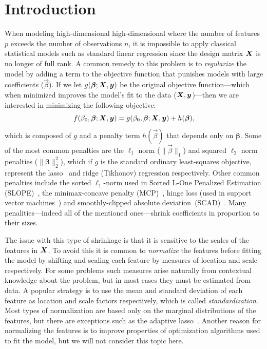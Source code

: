 \section{Introduction}

When modeling high-dimensional high-dimensional where the number of features \(p\) exceeds
the number of observations \(n\), it is impossible to apply classical statistical models
such as standard linear regression since the design matrix \(\boldsymbol X\) is no longer of full
rank. A common remedy to this problem is to \emph{regularize} the model by adding a term to
the objective function that punishes models with large coefficients (\(\vec\beta\)). If we
let \(g(\boldsymbol\beta; \boldsymbol X, \boldsymbol y)\) be the original objective function---which when
minimized improves the model's fit to the data (\(\boldsymbol X, \boldsymbol y\))---then we are
interested in minimizing the following objective:
\begin{equation}
  \label{eq:general-objective}
  f(\beta_0, \boldsymbol\beta; \boldsymbol X, \boldsymbol y) = g(\beta_0, \boldsymbol\beta; \boldsymbol X, \boldsymbol y) + h(\boldsymbol\beta),
\end{equation}
which is composed of \(g\) and a penalty term \(h(\vec\beta)\) that depends only on \(\bm{\beta}\).
Some of the most common penalties are the \(\ell_1\) norm (\(\lVert \vec\beta \rVert_1\)) and squared \(\ell_2\) norm
penalties (\(\lVert \bm{\beta} \rVert_2^2\)), which if \(g\) is the standard ordinary least-squares objective, represent
the lasso~\citep{tibshirani1996,santosa1986,donoho1994} and ridge (Tikhonov) regression
respectively. Other common penalties include the sorted \(\ell_1\)-norm used in Sorted
L-One Penalized Estimation (SLOPE)~\citep{bogdan2013,zeng2014,bogdan2015}, the
minimax-concave penalty (MCP)~\citep{zhang2010}, hinge loss (used in support vector
machines~\citep{cortes1995}) and smoothly-clipped absolute
deviation~(SCAD)~\citep{fan2001}. Many penalities---indeed all of the mentioned
ones---shrink coefficients in proportion to their sizes.

The issue with this type of shrinkage is that it is sensitive to the scales of the features
in \(\boldsymbol X\). To avoid this it is common to \emph{normalize} the features before fitting
the model by shifting and scaling each feature by measures of location and scale
respectively. For some problems such measures arise naturally from contextual knowledge
about the problem, but in most cases they must be estimated from data. A popular strategy
is to use the mean and standard deviation of each feature as location and scale factors
respectively, which is called \emph{standardization}. Most types of normalization are based
only on the marginal distributions of the features, but there are exceptions such as the
adaptive lasso~\citep{zou2006}. Another reason for normalizing the features is to improve
properties of optimization algorithms used to fit the model, but we will not consider this
topic here.

